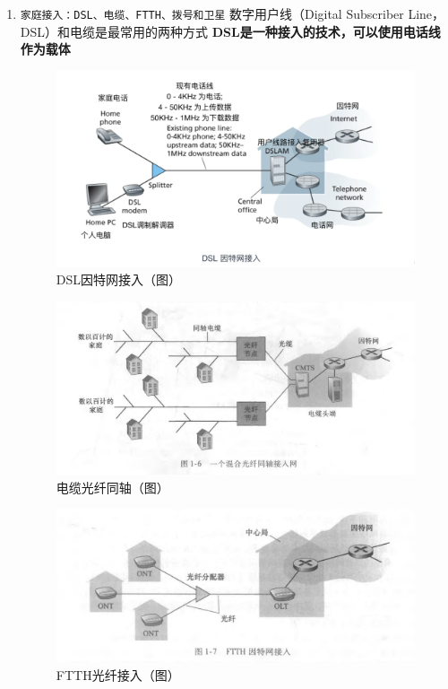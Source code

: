 \documentclass[11pt]{article}
\begin{document}
\begin{enumerate}
\item \texttt{家庭接入：DSL、电缆、FTTH、拨号和卫星}
数字用户线（Digital Subscriber Line，DSL）和电缆是最常用的两种方式
\textbf{DSL是一种接入的技术，可以使用电话线作为载体}
\begin{figure}[htbp]
\centering
\includegraphics[width=.9\linewidth]{imag/Snipaste_2023-11-19_23-58-23.png}
\caption{DSL因特网接入（图）}
\end{figure}

\begin{figure}[htbp]
\centering
\includegraphics[width=.9\linewidth]{imag/Snipaste_2023-11-20_20-31-47.png}
\caption{电缆光纤同轴（图）}
\end{figure}

\begin{figure}[htbp]
\centering
\includegraphics[width=.9\linewidth]{imag/Snipaste_2023-11-20_20-44-33.png}
\caption{FTTH光纤接入（图）}
\end{figure}


\end{enumerate}
\end{document}
